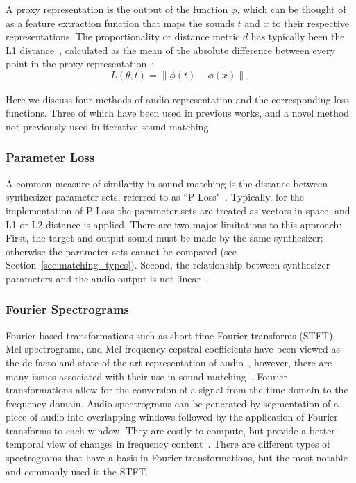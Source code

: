\documentclass[lettersize,journal]{IEEEtran}
\providecommand{\gls}[1]{#1}
\begin{document}
\noindent

A proxy representation is the output of the function \( \phi \), which can be thought of as a feature extraction function that maps the sounds \( t \) and \( x \) to their respective representations. 
The proportionality or distance metric $d$ has typically been the L1 distance~\cite{turian2020sorry,richard2025model}, calculated as the mean of the absolute difference between every point in the proxy representation~\cite{engel2020ddsp,vahidi2023mesostructures}:
\[
L(\theta, t) = \left\| \phi(t) - \phi(x) \right\|_1
\]

Here we discuss four methods of audio representation and the corresponding loss functions. Three of which have been used in previous works, and a novel method not previously used in iterative sound-matching. 

\subsubsection{Parameter Loss}
A common measure of similarity in sound-matching is the distance between synthesizer parameter sets, referred to as ``P-Loss"~\cite{han2023perceptual}. Typically, for the implementation of P-Loss the parameter sets are treated as vectors in space, and L1 or L2 distance is applied. There are two major limitations to this approach: First, the target and output sound must be made by the same synthesizer; otherwise the parameter sets cannot be compared (see Section~\ref{sec:matching_types}). Second, the relationship between synthesizer parameters and the audio output is not linear~\cite{shier2020spiegelib,han2023perceptual,esling2019flow}. 

\subsubsection{Fourier Spectrograms}
\label{sec:fourier_specs}
Fourier-based transformations such as short-time Fourier transforms (\gls{STFT}), Mel-spectrograms, and Mel-frequency cepstral coefficients have been viewed as the de facto and state-of-the-art representation of audio~\cite{beauchamp2003error,mitchell2007evolutionary,yee2018automatic}, however, there are many issues associated with their use in sound-matching~\cite{turian2020sorry,vahidi2023mesostructures,han2023perceptual,uzrad2024diffmoog}. Fourier transformations allow for the conversion of a signal from the time-domain to the frequency domain. Audio spectrograms can be generated by segmentation of a piece of audio into overlapping windows followed by the application of Fourier transforms to each window. They are costly to compute, but provide a better temporal view of changes in frequency content~\cite{muller2007dynamic,smith2007mathematics}. There are different types of spectrograms that have a basis in Fourier transformations, but the most notable and commonly used is the STFT.  
\end{document}
